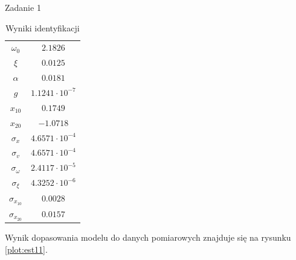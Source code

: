 \documentclass[12pt]{article}
\begin{document}
\begin{section}{Zadanie 1}
    \begin{table}[!htb]
      \begin{center}
        \begin{tabular}{|c|c|}
          \hline
          $\omega_0$        & $ 2.1826 $ \\
          $\xi$             & $ 0.0125 $ \\
          $\alpha$          & $ 0.0181 $ \\
          $g$               & $ 1.1241\cdot 10^{-7} $ \\
          $x_{10}$          & $  0.1749 $ \\
          $x_{20}$          & $ -1.0718 $ \\
          $\sigma_{x}$      & $ 4.6571\cdot 10^{-4} $ \\
          $\sigma_{v}$      & $ 4.6571\cdot 10^{-4} $ \\
          \hline
          $\sigma_{\omega}$ & $ 2.4117\cdot 10^{-5} $ \\ 
          $\sigma_{\xi}$    & $ 4.3252\cdot 10^{-6} $ \\
          $\sigma_{x_{10}}$ & $ 0.0028 $ \\
          $\sigma_{x_{20}}$ & $ 0.0157 $ \\
          \hline
        \end{tabular}
      \end{center}
      \label{tab:wyn11}
      \caption{Wyniki identyfikacji}
    \end{table}
    
    \newpage
    
    Wynik dopasowania modelu do danych pomiarowych znajduje się na rysunku
    \ref{plot:est11}.


\end{section}
\end{document}
